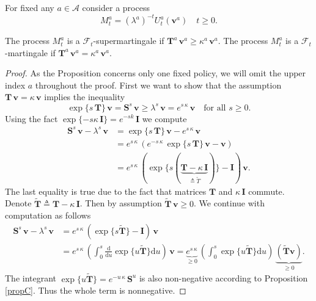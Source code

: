 For fixed any $a\in\mathcal{A}$ consider a process
\begin{equation}
M_{t}^{a}=(\lambda^a)^{-t}U_t^a(\bm{v}^a) \quad t\geq0.
\end{equation}
\begin{prop}
\label{MMlem}
The process $M_{t}^{a}$ is a $\mathcal{F}_t$-supermartingale if $\bm{T}^a\,\bm{v}^a\geq\kappa^a\,\bm{v}^a$. The process $M_{t}^{a}$ is a $\mathcal{F}_t$-martingale if $\bm{T}^a\,\bm{v}^a=\kappa^a\,\bm{v}^a$.
\end{prop}
\begin{proof}
As the Proposition concerns only one fixed policy, we will omit the upper index $a$ throughout the proof. %
First we want to show that the assumption $\bm{T}\,\bm{v}=\kappa\,\bm{v}$ implies the inequality  \[\exp\{s\,\bm{T}\}\,\bm{v}=\bm{S}^s\,\bm{v}\geq\lambda^s\,\bm{v}=e^{s\,\kappa}\,\bm{v} \quad\text{for all } s\geq0.\]
Using the fact $\exp\{-s\kappa\,\bm{I}\}=e^{-sk}\bm\,\bm{I}$ we compute
\begin{align*}
\bm{S}^s\,\bm{v}-\lambda^s\,\bm{v}&=\exp\{s\,\bm{T}\}\,\bm{v}-e^{s\,\kappa}\,\bm{v}\\
&=e^{s\,\kappa}\,(e^{-s\,\kappa}\,\exp\{s\,\bm{T}\}\,\bm{v}-\bm{v})\\
&=e^{s\,\kappa}\,(\exp\{s(\underbrace{\bm{T}-\kappa\,\bm{I}}_{\triangleq\widetilde{T}})\}-\bm{I})\,\bm{v}.
\end{align*}
The last equality is true due to the fact that matrices $\bm{T}$ and $\kappa\,\bm{I}$ commute. Denote $\widetilde{\bm{T}}\triangleq \bm{T}-\kappa\,\bm{I}$. Then by assumption $\widetilde{\bm{T}}\,\bm{v}\geq0$. We continue with computation as follows
\begin{align*}
\bm{S}^s\,\bm{v}-\lambda^s\,\bm{v}&=e^{s\,\kappa}\,(\exp\{s\widetilde{\bm{T}}\}-\bm{I})\,\bm{v}\\
&=e^{s\,\kappa}\,\left(\int_0^s \frac{\mathrm{d}}{\mathrm{d}u}\exp\{u\widetilde{\bm{T}}\}\mathrm{d} u \right)\,\bm{v}
=\underbrace{e^{s\,\kappa}}_{\geq 0}\,\left(\int_0^s \exp\{u\widetilde{\bm{T}}\}\mathrm{d} u\right) \,\underbrace{(\widetilde{\bm{T}}\bm{v})}_{\geq 0}.
\end{align*}
The integrant $\exp\{u\widetilde{\bm{T}}\}=e^{-u\,\kappa}\,\bm{S}^{u}$ is also non-negative according to Proposition \ref{propC}. Thus the whole term is nonnegative. 


\end{proof}
